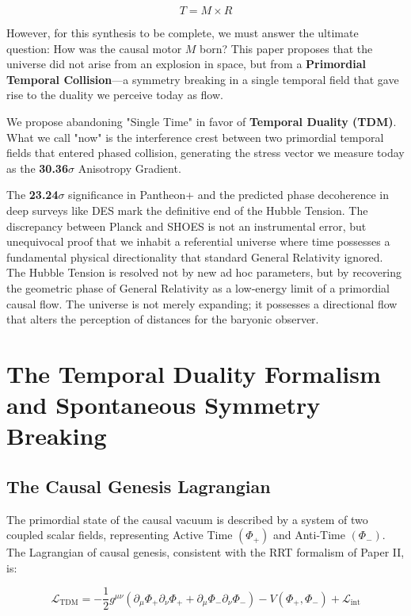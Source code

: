 \documentclass[12pt, a4paper]{article}
\begin{document}
\[
T = M \times R
\]

However, for this synthesis to be complete, we must answer the ultimate question: How was the causal motor \(M\) born? This paper proposes that the universe did not arise from an explosion in space, but from a \textbf{Primordial Temporal Collision}—a symmetry breaking in a single temporal field that gave rise to the duality we perceive today as flow.

We propose abandoning "Single Time" in favor of \textbf{Temporal Duality (TDM)}. What we call "now" is the interference crest between two primordial temporal fields that entered phased collision, generating the stress vector we measure today as the \textbf{30.36$\sigma$} Anisotropy Gradient.

The \textbf{23.24$\sigma$} significance in Pantheon+ and the predicted phase decoherence in deep surveys like DES mark the definitive end of the Hubble Tension. The discrepancy between Planck and SHOES is not an instrumental error, but unequivocal proof that we inhabit a referential universe where time possesses a fundamental physical directionality that standard General Relativity ignored. The Hubble Tension is resolved not by new ad hoc parameters, but by recovering the geometric phase of General Relativity as a low-energy limit of a primordial causal flow. The universe is not merely expanding; it possesses a directional flow that alters the perception of distances for the baryonic observer.

\section{The Temporal Duality Formalism and Spontaneous Symmetry Breaking}

\subsection{The Causal Genesis Lagrangian}

The primordial state of the causal vacuum is described by a system of two coupled scalar fields, representing Active Time \((\Phi_{+})\) and Anti-Time \((\Phi_{-})\). The Lagrangian of causal genesis, consistent with the RRT formalism of Paper II, is:

\[
\mathcal{L}_{\text{TDM}} = -\frac{1}{2}g^{\mu\nu}(\partial_{\mu}\Phi_{+}\partial_{\nu}\Phi_{+} + \partial_{\mu}\Phi_{-}\partial_{\nu}\Phi_{-}) - V(\Phi_{+}, \Phi_{-}) + \mathcal{L}_{\text{int}}
\]
\end{document}

